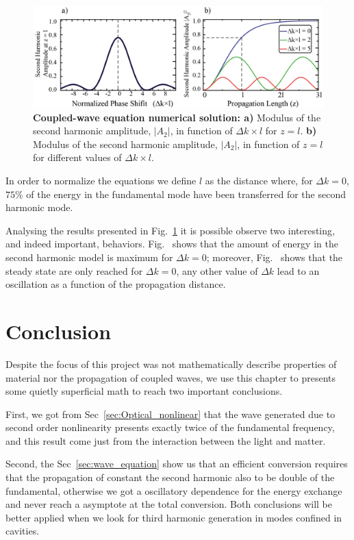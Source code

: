 \begin{figure}[th!]
    \centering
    \includegraphics[width = 16cm]{figuras/Dissertation_coppled_eq_sol.jpg}
    \caption{\textbf{Coupled-wave equation numerical solution: a)} Modulus of the second harmonic amplitude, $|A_2|$, in function of $\Delta k \times l$ for $z = l$. \textbf{b)} Modulus of the second harmonic amplitude, $|A_2|$, in function of $z = l$ for different values of $\Delta k \times l$.}
    \label{fig:model_solution}
\end{figure}

In order to normalize the equations we define $l$ as the distance where, for $\Delta k = 0$, $75\%$ of the energy in the fundamental mode have been transferred for the second harmonic mode. 

Analysing the results presented in Fig.~\ref{fig:model_solution} it is possible observe two interesting, and indeed important, behaviors. Fig.~ shows that the amount of energy in the second harmonic model is maximum for $\Delta k = 0$; moreover, Fig.~ shows that the steady state are only reached for $\Delta k = 0$, any other value of $\Delta k$ lead to an oscillation as a function of the propagation distance.

\section{Conclusion}
Despite the focus of this project was not mathematically describe properties of material nor the propagation of coupled waves, we use this chapter to presents some quietly superficial math to reach two important conclusions.

First, we got from Sec~\ref{sec:Optical_nonlinear} that the wave generated due to second order nonlinearity presents exactly twice of the fundamental frequency, and this result come just from the interaction between the light and matter. 

Second, the Sec~\ref{sec:wave_equation} show us that an efficient conversion requires that the propagation of constant the second harmonic also to be double of the fundamental, otherwise we got a oscillatory dependence for the energy exchange and never reach a asymptote at the total conversion. 
% 
%
%
Both conclusions will be better applied when we look for third harmonic generation in  modes confined in cavities. 

